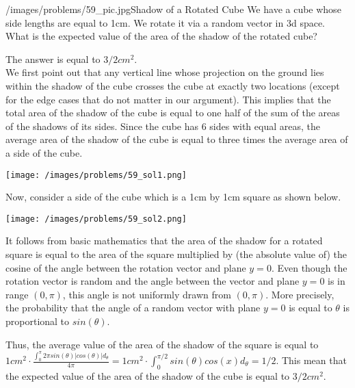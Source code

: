 \begin{problem}{/images/problems/59_pic.jpg}{Shadow of a Rotated Cube}  We have a cube whose side lengths are equal to 1cm. We  rotate it via a random vector in 3d space. What is the expected value of the area of the shadow of the rotated cube?
\end{problem}
\begin{solution}
The answer is equal to $3/2cm^2$.\\[0.2cm]
We first point out that any vertical line whose projection on the ground lies within the shadow of the cube crosses the cube at exactly two locations (except for the edge cases that do not matter in our argument). This implies that the total area of the shadow of the cube is equal to one half of the sum of the areas of the shadows of its sides. Since the cube has 6 sides with equal areas, the average area of the shadow of the cube is equal to three times the average area of a side of the cube.

\begin{center}
	\texttt{[image: /images/problems/59\_sol1.png]}
\end{center}

Now, consider a side of the cube which is a 1cm by 1cm square as shown below.
\begin{center}
	\texttt{[image: /images/problems/59\_sol2.png]}
\end{center}
It follows from basic mathematics that the area of the shadow for a rotated square is equal to the area of the square multiplied by (the absolute value of) the cosine of the angle between the rotation vector and plane $y=0$. 
Even though the rotation vector is random and the angle between the vector and plane $y=0$ is in range $(0, \pi)$, this angle is not uniformly drawn from $(0, \pi)$. More precisely, the probability that the angle of a random vector with plane $y=0$ is equal to $\theta$ is proportional to $sin(\theta)$.

 Thus, the average value of the area of the shadow of the square is equal to $1cm^2 \cdot \frac{\int_{0}^{\pi} 2\pi sin(\theta) |cos(\theta)| d_\theta}{4\pi} = 1cm^2 \cdot \int_{0}^{\pi/2}sin(\theta) cos(x) d_\theta =1/2$. This mean that the  expected value of the area of the shadow of the cube is equal to $3/2 cm^2$.
\end{solution}

